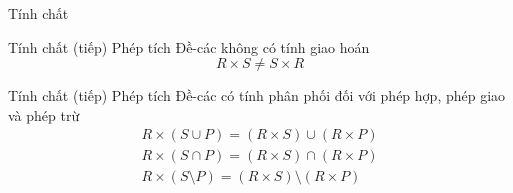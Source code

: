 \documentclass[11pt]{beamer}
\begin{document}
  \begin{frame}{Tính chất}
  \end{frame}
  \begin{frame}{Tính chất (tiếp)}
    Phép tích Đề-các không có tính giao hoán
    $$R \times S \neq S \times R$$
  \end{frame}
  \begin{frame}{Tính chất (tiếp)}
    Phép tích Đề-các có tính phân phối đối với phép hợp, phép giao và phép trừ
    \begin{gather*}
      R \times (S \cup P) = (R \times S) \cup (R \times P) \\
      R \times (S \cap P) = (R \times S) \cap (R \times P) \\
      R \times (S \setminus P) = (R \times S) \setminus (R \times P)
    \end{gather*}
  \end{frame}
\end{document}
